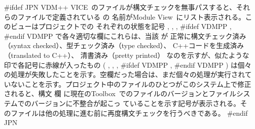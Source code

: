 \documentclass[\pformat,12pt]{article}
\newcommand{\vdmslpp}{VDM-SL}
\newcommand{\Toolbox}{Toolbox}
\newcommand{\vdmModView}{\guicmd{Module View}}
\newcommand{\vdmModView}{\guicmd{モジュールビュー}}
\newcommand{\vdmslpp}{VDM++}
\newcommand{\Toolbox}{Toolbox}
\renewcommand{\vdmslpp}{VDM++ VICE}
\newcommand{\vdmModView}{\guicmd{VDM View}}
\newcommand{\vdmModView}{\guicmd{VDMビュー}}
\newcommand{\guicmd}[1]{{\sf #1}}
\newcommand{\guicmd}[1]{{\gt #1}}
\begin{document}
#ifdef JPN
\vdmslpp\ のファイルが構文チェックを無事パスすると、それらのファイルで定義されている
 の
名前が\vdmModView\ にリスト表示される。このビューはプロジェクトでの
 それぞれの状態を記号
,
,
,
#ifdef VDMPP
,
#endif VDMPP
で各々適切な欄にこれらは、当該 が
正常に構文チェック済み（syntax checked）、型チェック済み（type checked）、
C++コードを生成済み（translated to C++）、
 清書済み（pretty printed）
なのを示すが、似たような印で各記号に赤線が入ったもの
(%
,
,
,
#ifdef VDMPP
,
#endif VDMPP
)
は個々の処理が失敗したことを示す。空欄だった場合は、まだ個々の処理が実行されて
いないことを示す。プロジェクト中のファイルのひとつがこのシステム上で修正されると、\guicmd{構文} 欄
に現在の\Toolbox\ でのファイルのバージョンとファイルシステムでのバージョンに不整合が起こっ
ていることを示す記号が表示される。そのファイルは他の処理に進む前に再度構文チェックを行うべきである。
#endif JPN
\end{document}
